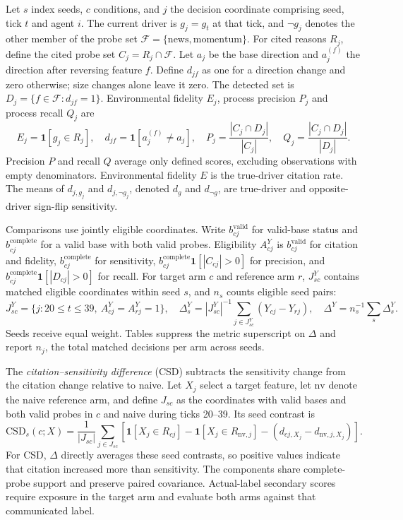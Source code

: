 \documentclass[futureinternet,article,submit,moreauthors,pdftex]{Definitions/mdpi}
\newcommand{\Fprobe}{\mathcal{F}}
\newcommand{\ind}{\mathbf{1}}
\begin{document}
Let $s$ index seeds, $c$ conditions, and $j$ the decision coordinate comprising seed, tick $t$ and agent $i$. The current driver is $g_j=g_t$ at that tick, and $\neg g_j$ denotes the other member of the probe set $\Fprobe=\{\mathrm{news},\mathrm{momentum}\}$. For cited reasons $R_j$, define the cited probe set $C_j=R_j\cap\Fprobe$. Let $a_j$ be the base direction and $a_j^{(f)}$ the direction after reversing feature $f$. Define $d_{jf}$ as one for a direction change and zero otherwise; size changes alone leave it zero. The detected set is $D_j=\{f\in\Fprobe:d_{jf}=1\}$. Environmental fidelity $E_j$, process precision $P_j$ and process recall $Q_j$ are
\begin{equation}
 E_j=\ind[g_j\in R_j],\quad d_{jf}=\ind[a_j^{(f)}\ne a_j],\quad
 P_j=\frac{|C_j\cap D_j|}{|C_j|},\quad Q_j=\frac{|C_j\cap D_j|}{|D_j|}.\label{eq:metrics}
\end{equation}
Precision $P$ and recall $Q$ average only defined scores, excluding observations with empty denominators. Environmental fidelity $E$ is the true-driver citation rate. The means of $d_{j,g_j}$ and $d_{j,\neg g_j}$, denoted $d_g$ and $d_{\neg g}$, are true-driver and opposite-driver sign-flip sensitivity.

Comparisons use jointly eligible coordinates. Write $b^{\mathrm{valid}}_{cj}$ for valid-base status and $b^{\mathrm{complete}}_{cj}$ for a valid base with both valid probes. Eligibility $A^Y_{cj}$ is $b^{\mathrm{valid}}_{cj}$ for citation and fidelity, $b^{\mathrm{complete}}_{cj}$ for sensitivity, $b^{\mathrm{complete}}_{cj}\ind[|C_{cj}|>0]$ for precision, and $b^{\mathrm{complete}}_{cj}\ind[|D_{cj}|>0]$ for recall. For target arm $c$ and reference arm $r$, $J_{sc}^{Y}$ contains matched eligible coordinates within seed $s$, and $n_s$ counts eligible seed pairs:
\begin{equation}
 J_{sc}^{Y}=\{j:20\le t\le39,\ A_{cj}^{Y}=A_{rj}^{Y}=1\},\quad
 \Delta_s^Y=|J_{sc}^{Y}|^{-1}\!\sum_{j\in J_{sc}^{Y}}(Y_{cj}-Y_{rj}),\quad
 \Delta^Y=n_s^{-1}\sum_s\Delta_s^Y.\label{eq:support}
\end{equation}
Seeds receive equal weight. Tables suppress the metric superscript on $\Delta$ and report $n_j$, the total matched decisions per arm across seeds.

The \emph{citation--sensitivity difference} (CSD) subtracts the sensitivity change from the citation change relative to naive. Let $X_j$ select a target feature, let $\mathrm{nv}$ denote the naive reference arm, and define $J_{sc}$ as the coordinates with valid bases and both valid probes in $c$ and naive during ticks 20--39. Its seed contrast is
\begin{equation}
 \mathrm{CSD}_s(c;X)=\frac{1}{|J_{sc}|}\sum_{j\in J_{sc}}\left[\ind[X_j\in R_{cj}]-\ind[X_j\in R_{\mathrm{nv},j}]-(d_{cj,X_j}-d_{\mathrm{nv},j,X_j})\right].\label{eq:csd}
\end{equation}
For CSD, $\Delta$ directly averages these seed contrasts, so positive values indicate that citation increased more than sensitivity. The components share complete-probe support and preserve paired covariance. Actual-label secondary scores require exposure in the target arm and evaluate both arms against that communicated label.
\end{document}

